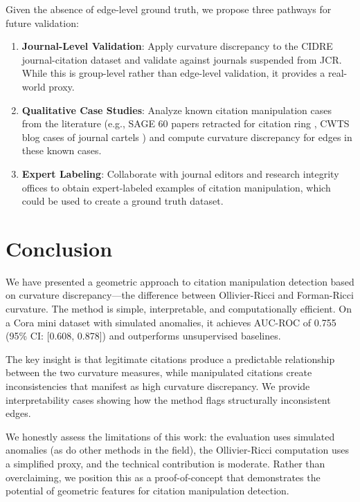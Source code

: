 \documentclass[11pt,letterpaper]{article}
\begin{document}
Given the absence of edge-level ground truth, we propose three pathways for future validation:

\begin{enumerate}
  \item \textbf{Journal-Level Validation}: Apply curvature discrepancy to the CIDRE journal-citation dataset \cite{Kojaku2021} and validate against journals suspended from JCR. While this is group-level rather than edge-level validation, it provides a real-world proxy.

  \item \textbf{Qualitative Case Studies}: Analyze known citation manipulation cases from the literature (e.g., SAGE 60 papers retracted for citation ring \cite{RetractionWatch2014}, CWTS blog cases of journal cartels \cite{CWTS2021}) and compute curvature discrepancy for edges in these known cases.

  \item \textbf{Expert Labeling}: Collaborate with journal editors and research integrity offices to obtain expert-labeled examples of citation manipulation, which could be used to create a ground truth dataset.
\end{enumerate}

\section{Conclusion}

We have presented a geometric approach to citation manipulation detection based on curvature discrepancy---the difference between Ollivier-Ricci and Forman-Ricci curvature. The method is simple, interpretable, and computationally efficient. On a Cora mini dataset with simulated anomalies, it achieves AUC-ROC of 0.755 (95\% CI: [0.608, 0.878]) and outperforms unsupervised baselines.

The key insight is that legitimate citations produce a predictable relationship between the two curvature measures, while manipulated citations create inconsistencies that manifest as high curvature discrepancy. We provide interpretability cases showing how the method flags structurally inconsistent edges.

We honestly assess the limitations of this work: the evaluation uses simulated anomalies (as do other methods in the field), the Ollivier-Ricci computation uses a simplified proxy, and the technical contribution is moderate. Rather than overclaiming, we position this as a proof-of-concept that demonstrates the potential of geometric features for citation manipulation detection.
\end{document}
